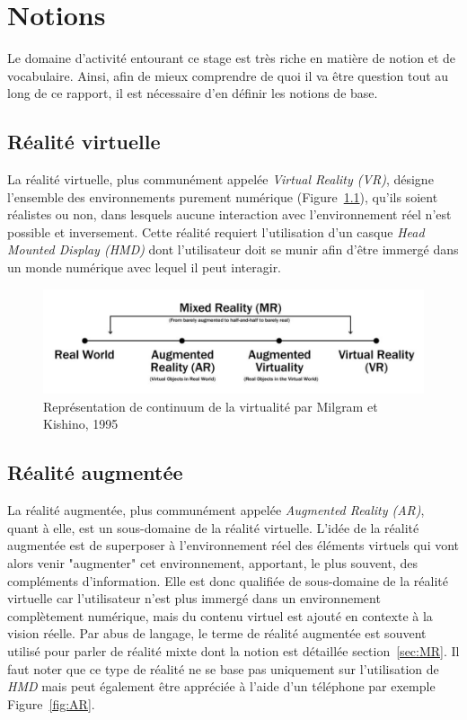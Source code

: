 \newpage
\chapter{Notions}
\label{chap:notions}

Le domaine d'activité entourant ce stage est très riche en matière de notion et de vocabulaire. Ainsi, afin de mieux comprendre de quoi il va être question tout au long de ce rapport, il est nécessaire d'en définir les notions de base.

\section{Réalité virtuelle}
La réalité virtuelle\cite{milgram1995augmented}, plus communément appelée \emph{Virtual Reality (VR)}, désigne l'ensemble des environnements purement numérique (Figure~\ref{fig:realityspectrum}), qu'ils soient réalistes ou non, dans lesquels aucune interaction avec l'environnement réel n'est possible et inversement. Cette réalité requiert l'utilisation d'un casque \emph{Head Mounted Display (HMD)} dont l'utilisateur doit se munir afin d'être immergé dans un monde numérique avec lequel il peut interagir.

\begin{figure}[H]
\centering
\includegraphics[width=\linewidth]{images/RealitySpectrum}
\caption{Représentation de continuum de la virtualité par Milgram et Kishino, 1995\cite{milgram1995augmented}}
\label{fig:realityspectrum}
\end{figure}

\section{Réalité augmentée}
La réalité augmentée\cite{milgram1995augmented}, plus communément appelée \emph{Augmented Reality (AR)}, quant à elle, est un sous-domaine de la réalité virtuelle. L'idée de la réalité augmentée est de superposer à l'environnement réel des éléments virtuels qui vont alors venir "augmenter" cet environnement, apportant, le plus souvent, des compléments d'information. Elle est donc qualifiée de sous-domaine de la réalité virtuelle car l'utilisateur n'est plus immergé dans un environnement complètement numérique, mais du contenu virtuel est ajouté en contexte à la vision réelle. Par abus de langage, le terme de réalité augmentée est souvent utilisé pour parler de réalité mixte dont la notion est détaillée section~\ref{sec:MR}.
Il faut noter que ce type de réalité ne se base pas uniquement sur l'utilisation de \emph{HMD} mais peut également être appréciée à l'aide d'un téléphone par exemple Figure~\ref{fig:AR}.

